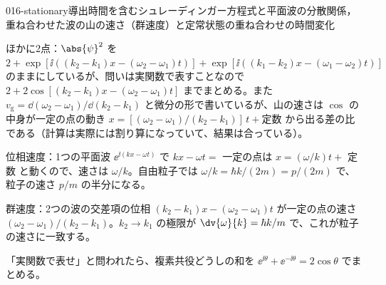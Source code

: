 \documentclass[uplatex,dvipdfmx,a4paper,11pt]{jsarticle}
\begin{document}
\begin{mondai}{016-stationary}{導出}{時間を含むシュレーディンガー方程式と平面波の分散関係，重ね合わせた波の山の速さ（群速度）と定常状態の重ね合わせの時間変化}
\begin{kotaeran}
  ほかに2点：$\abs{\psi}^{2}$ を $2+\exp[\ii((k_{2}-k_{1})x-(\omega_{2}-\omega_{1})t)]+\exp[\ii((k_{1}-k_{2})x-(\omega_{1}-\omega_{2})t)]$ のままにしているが、問いは実関数で表すことなので $2+2\cos[(k_{2}-k_{1})x-(\omega_{2}-\omega_{1})t]$ までまとめる。また $v_{\mathrm{g}}=\dd(\omega_{2}-\omega_{1})/\dd(k_{2}-k_{1})$ と微分の形で書いているが、山の速さは $\cos$ の中身が一定の点の動き $x=[(\omega_{2}-\omega_{1})/(k_{2}-k_{1})]\,t+\text{定数}$ から出る差の比である（計算は実際には割り算になっていて、結果は合っている）。
\end{kotaeran}
\begin{rikai}
  \item 位相速度：1つの平面波 $\ee^{\ii(kx-\omega t)}$ で $kx-\omega t=$ 一定の点は $x=(\omega/k)t+$ 定数 と動くので、速さは $\omega/k$。自由粒子では $\omega/k=\hbar k/(2m)=p/(2m)$ で、粒子の速さ $p/m$ の半分になる。
  \item 群速度：2つの波の交差項の位相 $(k_{2}-k_{1})x-(\omega_{2}-\omega_{1})t$ が一定の点の速さ $(\omega_{2}-\omega_{1})/(k_{2}-k_{1})$。$k_{2}\to k_{1}$ の極限が $\dv{\omega}{k}=\hbar k/m$ で、これが粒子の速さに一致する。
  \item 「実関数で表せ」と問われたら、複素共役どうしの和を $\ee^{\ii\theta}+\ee^{-\ii\theta}=2\cos\theta$ でまとめる。
\end{rikai}
\end{mondai}
\end{document}
